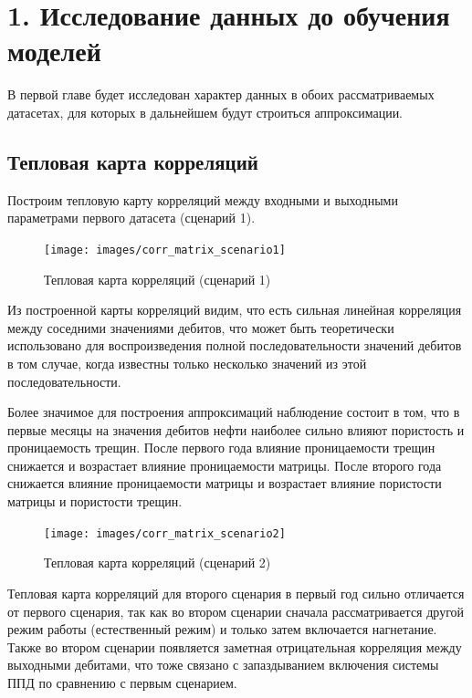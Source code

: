 
\chapter*{1. Исследование данных до обучения моделей} \label{ch1}
В первой главе будет исследован характер данных в обоих рассматриваемых датасетах, для которых в дальнейшем будут строиться аппроксимации.
\section{Тепловая карта корреляций} \label{ch1:sec1}
Построим тепловую карту корреляций между входными и выходными параметрами первого датасета (сценарий 1).

\begin{figure}[H] 
	\center
	\texttt{[image: images/corr\_matrix\_scenario1]}
	\caption{Тепловая карта корреляций (сценарий 1)} 
	\label{fig:heat-map-1}
\end{figure}
Из построенной карты корреляций видим, что есть сильная линейная корреляция между соседними значениями дебитов, что может быть теоретически использовано для воспроизведения полной последовательности значений дебитов в том случае, когда известны только несколько значений из этой последовательности. 

Более значимое для построения аппроксимаций наблюдение состоит в том, что в первые месяцы на значения дебитов нефти наиболее сильно влияют пористость и проницаемость трещин. После первого года влияние проницаемости трещин снижается и возрастает влияние проницаемости матрицы. После второго года снижается влияние проницаемости матрицы и возрастает влияние пористости матрицы и пористости трещин.

\begin{figure}[H] 
	\center
	\texttt{[image: images/corr\_matrix\_scenario2]}
	\caption{Тепловая карта корреляций (сценарий 2)} 
	\label{fig:heat-map-2}
\end{figure}

Тепловая карта корреляций для второго сценария в первый год сильно отличается от первого сценария, так как во втором сценарии сначала рассматривается другой режим работы (естественный режим) и только затем включается нагнетание. Также во втором сценарии появляется заметная отрицательная корреляция между выходными дебитами, что тоже связано с запаздыванием включения системы ППД по сравнению с первым сценарием.


